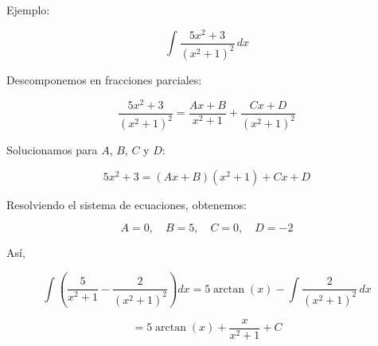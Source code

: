 Ejemplo:

\[
\int \frac{5x^2 + 3}{(x^2 + 1)^2} \, dx
\]

Descomponemos en fracciones parciales:

\[
\frac{5x^2 + 3}{(x^2 + 1)^2} = \frac{Ax + B}{x^2 + 1} + \frac{Cx + D}{(x^2 + 1)^2}
\]

Solucionamos para \(A\), \(B\), \(C\) y \(D\):

\[
5x^2 + 3 = (Ax + B)(x^2 + 1) + Cx + D
\]

Resolviendo el sistema de ecuaciones, obtenemos:

\[
A = 0, \quad B = 5, \quad C = 0, \quad D = -2
\]

Así,

\[
\int \left( \frac{5}{x^2 + 1} - \frac{2}{(x^2 + 1)^2} \right) dx = 5 \arctan(x) - \int \frac{2}{(x^2 + 1)^2} \, dx
\]

\[
= 5 \arctan(x) + \frac{x}{x^2 + 1} + C
\]